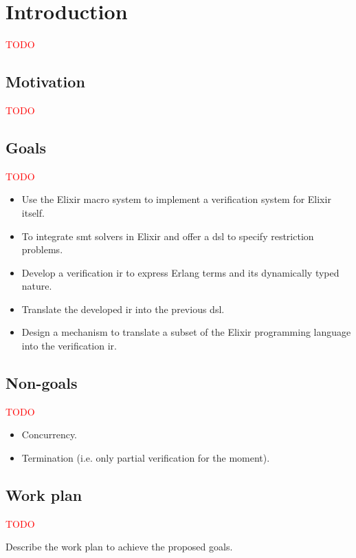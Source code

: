 \chapter{Introduction}
\label{cap:introduction}


\textcolor{red}{TODO}

\section{Motivation}

\textcolor{red}{TODO}

\section{Goals}

\textcolor{red}{TODO}

\begin{itemize}
  \item Use the Elixir macro system to implement a verification system 
    for Elixir itself.
  \item To integrate \acrshort{smt} solvers in Elixir and offer a \gls{dsl} 
    to specify restriction problems.
  \item Develop a verification \gls{ir} to express Erlang terms and its 
    dynamically typed nature.
  \item Translate the developed \gls{ir} into the previous \gls{dsl}.
  \item Design a mechanism to translate a subset of the Elixir 
    programming language into the verification \gls{ir}.
\end{itemize}

\section{Non-goals}

\textcolor{red}{TODO}

\begin{itemize}
  \item Concurrency.
  \item Termination (i.e. only partial verification for the moment).
\end{itemize}

\section{Work plan}

\textcolor{red}{TODO}

Describe the work plan to achieve the proposed goals.
